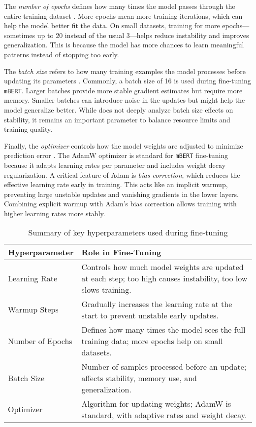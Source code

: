     The \textit{number of epochs} defines how many times the model passes through the entire training dataset \parencite{mosbachStabilityFinetuningBERT2021}. More epochs mean more training iterations, which can help the model better fit the data. On small datasets, training for more epochs—sometimes up to 20 instead of the usual 3—helps reduce instability and improves generalization. This is because the model has more chances to learn meaningful patterns instead of stopping too early.

    The \textit{batch size} refers to how many training examples the model processes before updating its parameters \parencite{mosbachStabilityFinetuningBERT2021}. Commonly, a batch size of 16 is used during fine-tuning \texttt{mBERT}. Larger batches provide more stable gradient estimates but require more memory. Smaller batches can introduce noise in the updates but might help the model generalize better. While \textcite{mosbachStabilityFinetuningBERT2021} does not deeply analyze batch size effects on stability, it remains an important parameter to balance resource limits and training quality.

    Finally, the \textit{optimizer} controls how the model weights are adjusted to minimize prediction error \parencite{mosbachStabilityFinetuningBERT2021}. The AdamW optimizer is standard for \texttt{mBERT} fine-tuning because it adapts learning rates per parameter and includes weight decay regularization. A critical feature of Adam is \textit{bias correction}, which reduces the effective learning rate early in training. This acts like an implicit warmup, preventing large unstable updates and vanishing gradients in the lower layers. Combining explicit warmup with Adam’s bias correction allows training with higher learning rates more stably.

    \vspace{0.6em}
    \begin{table}[h]
        \centering
        \begin{tabularx}{\textwidth}{l X}
        \toprule
        \textbf{Hyperparameter} & \textbf{Role in Fine-Tuning} \\
        \midrule
        Learning Rate & Controls how much model weights are updated at each step; too high causes instability, too low slows training. \\
        Warmup Steps & Gradually increases the learning rate at the start to prevent unstable early updates. \\
        Number of Epochs & Defines how many times the model sees the full training data; more epochs help on small datasets. \\
        Batch Size & Number of samples processed before an update; affects stability, memory use, and generalization. \\
        Optimizer & Algorithm for updating weights; AdamW is standard, with adaptive rates and weight decay. \\
        \bottomrule
        \end{tabularx}
        \caption{Summary of key hyperparameters used during fine-tuning}
    \end{table}


